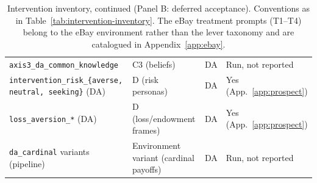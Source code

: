 \begin{table}[p]
\begin{tabular}{p{4.9cm} p{3.3cm} p{1.0cm} p{4.4cm}}
\texttt{axis3\_da\_common\_knowledge} & C3 (beliefs) & DA & Run, not reported \\
\texttt{intervention\_risk\_\{averse, neutral, seeking\}} (DA) & D (risk personas) & DA & Yes (App.~\ref{app:prospect}) \\
\texttt{loss\_aversion\_*} (DA) & D (loss/endowment frames) & DA & Yes (App.~\ref{app:prospect}) \\
\texttt{da\_cardinal} variants (pipeline) & Environment variant (cardinal payoffs) & DA & Run, not reported \\
\bottomrule
\end{tabular}
\caption{Intervention inventory, continued (Panel B: deferred acceptance). Conventions as in Table~\ref{tab:intervention-inventory}. The eBay treatment prompts (T1--T4) belong to the eBay environment rather than the lever taxonomy and are catalogued in Appendix~\ref{app:ebay}.}
\label{tab:intervention-inventory-da}
\end{table}
